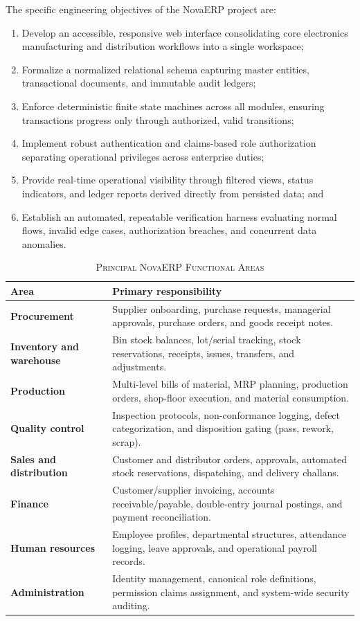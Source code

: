 \documentclass[conference]{IEEEtran}
\begin{document}
The specific engineering objectives of the NovaERP project are:
\begin{enumerate}
    \item Develop an accessible, responsive web interface consolidating core electronics manufacturing and distribution workflows into a single workspace;
    \item Formalize a normalized relational schema capturing master entities, transactional documents, and immutable audit ledgers;
    \item Enforce deterministic finite state machines across all modules, ensuring transactions progress only through authorized, valid transitions;
    \item Implement robust authentication and claims-based role authorization separating operational privileges across enterprise duties;
    \item Provide real-time operational visibility through filtered views, status indicators, and ledger reports derived directly from persisted data; and
    \item Establish an automated, repeatable verification harness evaluating normal flows, invalid edge cases, authorization breaches, and concurrent data anomalies.
\end{enumerate}

\begin{table}[htbp]
\caption{\textsc{Principal NovaERP Functional Areas}}
\label{tab:functional_areas}
\centering
\begin{tabularx}{\columnwidth}{>{\raggedright\arraybackslash\bfseries}p{2.3cm}X}
\toprule
Area & Primary responsibility \\
\midrule
Procurement & Supplier onboarding, purchase requests, managerial approvals, purchase orders, and goods receipt notes. \\
\addlinespace[2pt]
Inventory and warehouse & Bin stock balances, lot/serial tracking, stock reservations, receipts, issues, transfers, and adjustments. \\
\addlinespace[2pt]
Production & Multi-level bills of material, MRP planning, production orders, shop-floor execution, and material consumption. \\
\addlinespace[2pt]
Quality control & Inspection protocols, non-conformance logging, defect categorization, and disposition gating (pass, rework, scrap). \\
\addlinespace[2pt]
Sales and distribution & Customer and distributor orders, approvals, automated stock reservations, dispatching, and delivery challans. \\
\addlinespace[2pt]
Finance & Customer/supplier invoicing, accounts receivable/payable, double-entry journal postings, and payment reconciliation. \\
\addlinespace[2pt]
Human resources & Employee profiles, departmental structures, attendance logging, leave approvals, and operational payroll records. \\
\addlinespace[2pt]
Administration & Identity management, canonical role definitions, permission claims assignment, and system-wide security auditing. \\
\bottomrule
\end{tabularx}
\end{table}
\end{document}

